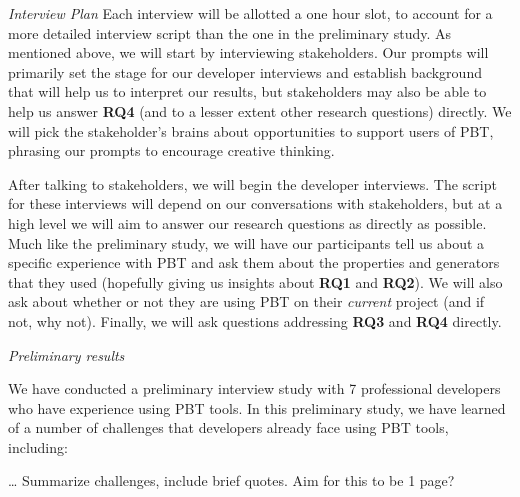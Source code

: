 
\textit{Interview Plan}
Each interview will be allotted a one hour slot, to account for a more detailed
interview script than the one in the preliminary study. As mentioned above, we
will start by interviewing stakeholders. Our prompts will primarily set the
stage for our developer interviews and establish background that will help us to
interpret our results, but stakeholders may also be able to help us answer {\bf
RQ4} (and to a lesser extent other research questions) directly. We will pick
the stakeholder's brains about opportunities to support users
of PBT, phrasing our prompts to encourage creative thinking.

After talking to stakeholders, we will begin the developer interviews. The
script for these interviews will depend on our conversations with stakeholders,
but at a high level we will aim to answer our research questions as directly as
possible. Much like the preliminary study, we will have our participants tell us about a
specific experience with PBT and ask them about the properties and generators
that they used (hopefully giving us insights about {\bf RQ1} and {\bf RQ2}).  We
will also ask about whether or not they are using PBT on their {\em current}
project (and if not, why not). Finally, we will ask questions addressing
{\bf RQ3} and {\bf RQ4} directly.

\textit{Preliminary results}

We have conducted a preliminary interview study with 7 professional developers
who have experience using PBT tools. In this preliminary study, we have learned
of a number of challenges that developers already face using PBT tools, including:

\ldots{} Summarize challenges, include brief quotes. Aim for this to be 1 page?

